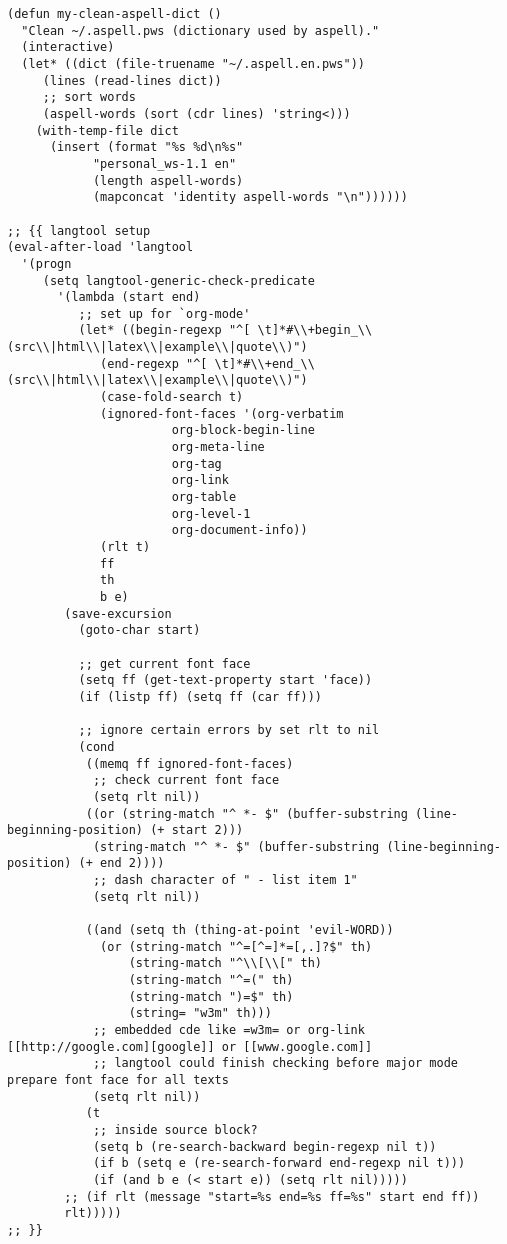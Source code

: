 \documentclass[11pt]{article}
\begin{document}
\begin{verbatim}
(defun my-clean-aspell-dict ()
  "Clean ~/.aspell.pws (dictionary used by aspell)."
  (interactive)
  (let* ((dict (file-truename "~/.aspell.en.pws"))
	 (lines (read-lines dict))
	 ;; sort words
	 (aspell-words (sort (cdr lines) 'string<)))
    (with-temp-file dict
      (insert (format "%s %d\n%s"
			"personal_ws-1.1 en"
			(length aspell-words)
			(mapconcat 'identity aspell-words "\n"))))))

;; {{ langtool setup
(eval-after-load 'langtool
  '(progn
     (setq langtool-generic-check-predicate
	   '(lambda (start end)
	      ;; set up for `org-mode'
	      (let* ((begin-regexp "^[ \t]*#\\+begin_\\(src\\|html\\|latex\\|example\\|quote\\)")
		     (end-regexp "^[ \t]*#\\+end_\\(src\\|html\\|latex\\|example\\|quote\\)")
		     (case-fold-search t)
		     (ignored-font-faces '(org-verbatim
					   org-block-begin-line
					   org-meta-line
					   org-tag
					   org-link
					   org-table
					   org-level-1
					   org-document-info))
		     (rlt t)
		     ff
		     th
		     b e)
		(save-excursion
		  (goto-char start)

		  ;; get current font face
		  (setq ff (get-text-property start 'face))
		  (if (listp ff) (setq ff (car ff)))

		  ;; ignore certain errors by set rlt to nil
		  (cond
		   ((memq ff ignored-font-faces)
		    ;; check current font face
		    (setq rlt nil))
		   ((or (string-match "^ *- $" (buffer-substring (line-beginning-position) (+ start 2)))
			(string-match "^ *- $" (buffer-substring (line-beginning-position) (+ end 2))))
		    ;; dash character of " - list item 1"
		    (setq rlt nil))

		   ((and (setq th (thing-at-point 'evil-WORD))
			 (or (string-match "^=[^=]*=[,.]?$" th)
			     (string-match "^\\[\\[" th)
			     (string-match "^=(" th)
			     (string-match ")=$" th)
			     (string= "w3m" th)))
		    ;; embedded cde like =w3m= or org-link [[http://google.com][google]] or [[www.google.com]]
		    ;; langtool could finish checking before major mode prepare font face for all texts
		    (setq rlt nil))
		   (t
		    ;; inside source block?
		    (setq b (re-search-backward begin-regexp nil t))
		    (if b (setq e (re-search-forward end-regexp nil t)))
		    (if (and b e (< start e)) (setq rlt nil)))))
		;; (if rlt (message "start=%s end=%s ff=%s" start end ff))
		rlt)))))
;; }}


\end{verbatim}
\end{document}
